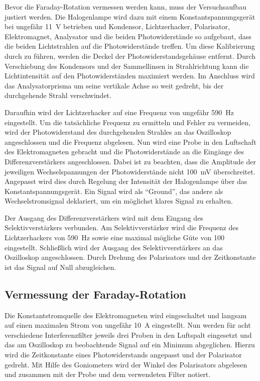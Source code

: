 Bevor die Faraday-Rotation vermessen werden kann, muss der Versuchsaufbau
justiert werden. Die Halogenlampe wird dazu mit einem
Konstantspannungsgerät bei ungefähr \SI{11}{\volt} betrieben und
Kondensor, Lichtzerhacker, Polarisator, Elektromagnet, Analysator und
die beiden Photowiderstände so aufgebaut, dass die beiden Lichtstrahlen auf
die Photowiderstände treffen.
Um diese Kalibrierung durch zu führen, werden die Deckel der
Photowiderstandsgehäuse entfernt.
Durch Verschiebung des Kondensors und der Sammellinsen in Strahlrichtung
kann die Lichtintensität auf den Photowiderständen maximiert werden.
Im Anschluss wird das Analysatorprisma um seine vertikale Achse so weit
gedreht, bis der durchgehende Strahl verschwindet.

Daraufhin wird der Lichtzerhacker auf eine Frequenz von ungefähr
\SI{590}{\hertz} eingestellt. Um die tatsächliche Frequenz zu ermitteln und
Fehler zu vermeiden, wird der Photowiderstand des durchgehenden
Strahles an das Oszilloskop angeschlossen und die Frequenz abgelesen.
Nun wird eine Probe in den Luftschaft des Elektromagneten gebracht und
die Photowiderstände an die Eingänge des Differenzverstärkers angeschlossen.
Dabei ist zu beachten, dass die Amplitude der jeweiligen
Wechselspannungen der Photowiderstände nicht \SI{100}{\milli\volt}
überschreitet. Angepasst wird dies durch Regelung der Intensität der
Halogenlampe über das Konstantspannungsgerät.
Ein Signal wird als \enquote{Ground}, das andere als Wechselstromsignal deklariert,
um ein möglichst klares Signal zu erhalten.

Der Ausgang des Differenzverstärkers wird mit dem Eingang des
Selektivverstärkers verbunden. Am Selektivverstärker wird die
Frequenz des Lichtzerhackers von \SI{590}{\hertz} sowie eine
maximal mögliche Güte von \num{100} eingestellt.
Schließlich wird der Ausgang des Selektivverstärkers an das Oszilloskop
angeschlossen. Durch Drehung des Polarisators und der Zeitkonstante
ist das Signal auf Null abzugleichen.


\subsection{Vermessung der Faraday-Rotation}
\label{sec:MessungFaraday}

Die Konstantstromquelle des Elektromagneten wird eingeschaltet und
langsam auf einen maximalen Strom von ungefähr \SI{10}{\ampere}
eingestellt. Nun werden für acht verschiedene Interferenzfilter
jeweils drei Proben in den Luftspalt eingesetzt und
das am Oszilloskop zu beobachtende Signal auf ein Minimum abgeglichen.
Hierzu wird die Zeitkonstante eines Photowiderstands angepasst und
der Polarisator gedreht. Mit Hilfe des Goniometers wird der Winkel
des Polarisators abgelesen und zusammen mit der Probe und dem verwendeten
Filter notiert.

